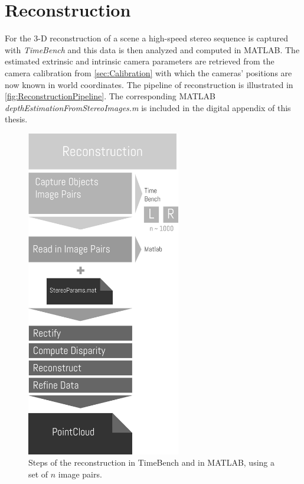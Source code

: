 \section{Reconstruction}\label{sec:Reconstruction}

For the 3-D reconstruction of a scene a high-speed stereo sequence is captured with \textit{TimeBench} and this data is then analyzed and computed in MATLAB. The estimated extrinsic and intrinsic camera parameters are retrieved from the camera calibration from \autoref{sec:Calibration} with which the cameras' positions are now known in world coordinates. The pipeline of reconstruction is illustrated in \autoref{fig:ReconstructionPipeline}. The corresponding MATLAB \textit{depthEstimationFromStereoImages.m} is included in the digital appendix of this thesis.

\begin{figure}[htbp]
		\centering
		\includegraphics[width=0.6\textwidth]{figures/Reconstruction}
		\caption[Steps of the reconstruction in TimeBench and in MATLAB]{Steps of the reconstruction in TimeBench and in MATLAB, using a set of $n$ image pairs.}
		\label{fig:ReconstructionPipeline}
\end{figure}

